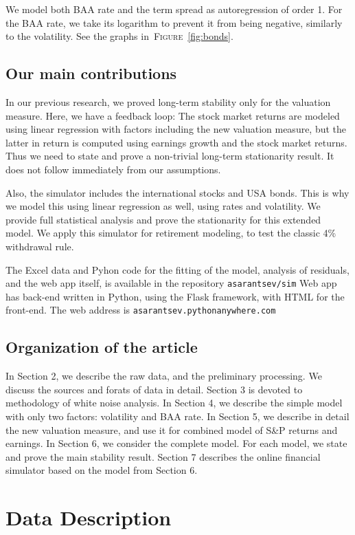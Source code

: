 \documentclass[12pt]{amsart}
\begin{document}
We model both BAA rate and the term spread as autoregression of order 1. For the BAA rate, we take its logarithm to prevent it from being negative, similarly to the volatility.  See the graphs in~\textsc{Figure}~\ref{fig:bonds}. 

\subsection{Our main contributions} In our previous research, we proved long-term stability only for the valuation measure. Here, we have a feedback loop: The stock market returns are modeled using linear regression with factors including the new valuation measure, but the latter in return is computed using earnings growth and the stock market returns. Thus we need to state and prove a non-trivial long-term stationarity result. It does not follow immediately from our assumptions. 

Also, the simulator includes the international stocks and USA bonds. This is why we model this using linear regression as well, using rates and volatility. We provide full statistical analysis and prove the stationarity for this extended model. We apply this simulator for retirement modeling, to test the classic 4\% withdrawal rule.

The Excel data and Pyhon code for the fitting of the model, analysis of residuals, and the web app itself, is available in the repository \texttt{asarantsev/sim} Web app has back-end written in Python, using the Flask framework, with HTML for the front-end. The web address is \texttt{asarantsev.pythonanywhere.com} 

\subsection{Organization of the article} In Section 2, we describe the raw data, and the preliminary processing. We discuss the sources and forats of data in detail. Section 3 is devoted to methodology of white noise analysis. In Section 4, we describe the simple model with only two factors: volatility and BAA rate. In Section 5, we describe in detail the new valuation measure, and use it for combined model of S\&P returns and earnings. In Section 6, we consider the complete model. For each model, we state and prove the main stability result. Section 7 describes the online financial simulator based on the model from Section 6. 

\section{Data Description} 
\end{document}
